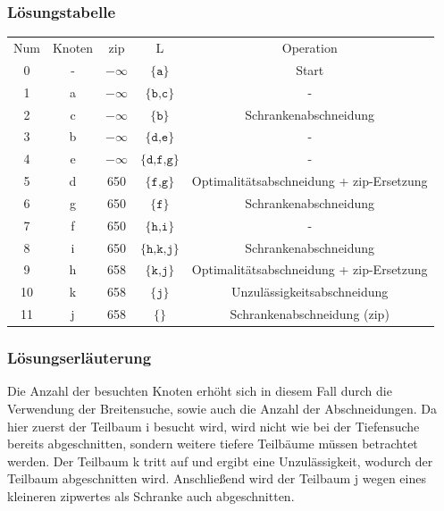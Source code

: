 \documentclass[a4paper,11pt]{article}
\begin{document}
\subsubsection*{Lösungstabelle}
    \begin{tabular}{ c c c c c }
        Num & Knoten & zip & L & Operation \\
        0 & - & $-\infty$ & $\texttt{\{a\}}$ & Start \\
        1 & a & $-\infty$ & $\texttt{\{b,c\}}$ & - \\
        2 & c & $-\infty$ & $\texttt{\{b\}}$ & Schrankenabschneidung \\
        3 & b & $-\infty$ & $\texttt{\{d,e\}}$ & - \\
        4 & e & $-\infty$ & $\texttt{\{d,f,g\}}$ & - \\
        5 & d & 650 & $\texttt{\{f,g\}}$ & Optimalitätsabschneidung + zip-Ersetzung \\
        6 & g & 650 & $\texttt{\{f\}}$ & Schrankenabschneidung \\
        7 & f & 650 & $\texttt{\{h,i\}}$ & - \\
        8 & i & 650 & $\texttt{\{h,k,j\}}$ & Schrankenabschneidung \\
        9 & h & 658 & $\texttt{\{k,j\}}$ &  Optimalitätsabschneidung + zip-Ersetzung \\
        10 & k & 658 & $\texttt{\{j\}}$ &  Unzulässigkeitsabschneidung \\
        11 & j & 658 & $\texttt{\{\}}$ &  Schrankenabschneidung (zip) \\
    \end{tabular}

\subsubsection*{Lösungserläuterung}
Die Anzahl der besuchten Knoten erhöht sich in diesem Fall durch die Verwendung der Breitensuche, sowie auch die Anzahl der Abschneidungen. Da hier zuerst der Teilbaum i besucht wird, wird nicht wie bei der Tiefensuche bereits abgeschnitten, sondern weitere tiefere Teilbäume müssen betrachtet werden. Der Teilbaum k tritt auf und ergibt eine Unzulässigkeit, wodurch der Teilbaum abgeschnitten wird. Anschließend wird der Teilbaum j wegen eines kleineren zipwertes als Schranke auch abgeschnitten.
\end{document}
